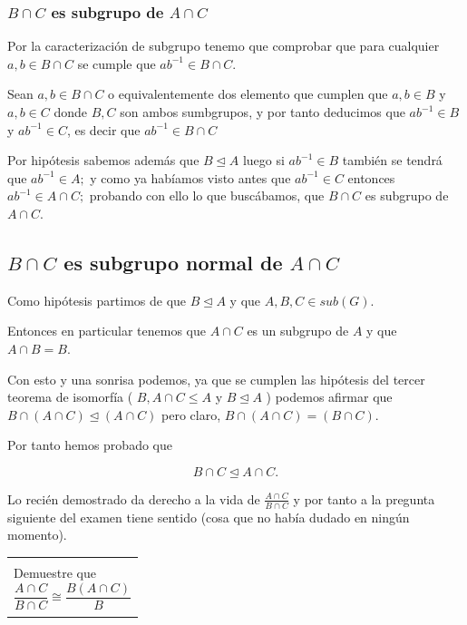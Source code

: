 \documentclass[12pt]{article}
\newenvironment{micaja}
{
    \begin{center}
    \begin{tabular}{|p{0.9\textwidth}|}
    \hline\\
    }   
    {   
    \\\\\hline
    \end{tabular} 
    \end{center}
    }
\begin{document}
\subsubsection*{$B \cap C$ es subgrupo de  $A  \cap C$ }

Por la caracterización de subgrupo
tenemo que comprobar que para cualquier $a,b \in B \cap C$ se cumple que 
$ab^{-1} \in B \cap C.$

Sean $a,b \in B \cap C$ o equivalentemente dos elemento que cumplen que
 $a,b \in B$ y $  a,b \in C$ donde $B,C$ son ambos sumbgrupos, 
 y por tanto deducimos que $ab^{-1} \in B$ y $ab^{-1} \in C$, es 
 decir que $ab^{-1} \in B \cap C$

Por hipótesis sabemos además que $B \trianglelefteq A$ luego si 
$ab^{-1} \in B$ también se tendrá que $ab^{-1} \in A;$ y como ya habíamos visto 
antes
que $ab^{-1} \in C$ entonces $ab^{-1} \in A  \cap C;$ probando con ello lo que 
buscábamos, que $B \cap C$ es subgrupo de  $A  \cap C.$


\subsection*{$B \cap C$ es subgrupo normal de  $A  \cap C$}

    Como hipótesis partimos de que $B \trianglelefteq A$ y que $A,B,C \in sub(G).$

Entonces en particular tenemos que $A \cap C$ es un subgrupo de $A$ y que $A \cap B = B.$

Con esto y una sonrisa podemos, ya que se cumplen las hipótesis del tercer teorema de isomorfía
( $B, A \cap C \leq A$ y $B \trianglelefteq A$ )
podemos afirmar que $B \cap (A \cap C) \trianglelefteq (A \cap C)$
pero claro, $B \cap (A \cap C) = (B \cap C).$

Por tanto hemos probado que 

\begin{equation*}
    B \cap C \trianglelefteq A \cap C.
\end{equation*}


Lo recién demostrado da derecho a la vida de  $\frac{A \cap C}{B \cap C}$
y por tanto a la pregunta siguiente del examen tiene sentido 
(cosa que no había dudado en ningún momento). 



\begin{micaja}
    Demuestre que 
\begin{equation*} 
    \frac{A \cap C}{B \cap C} \cong \frac{B(A \cap C)}{B}
\end{equation*}
\end{micaja}
\end{document}
